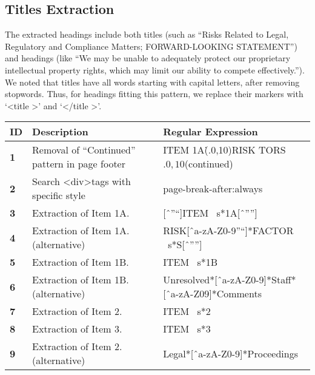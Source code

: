 \documentclass[logo,bsc,singlespacing,parskip]{infthesis}
\begin{document}
\subsection{Titles Extraction}

The extracted headings include both titles (such as “Risks Related to Legal, Regulatory and Compliance Matters; FORWARD-LOOKING STATEMENT”) and headings (like “We may be unable to adequately protect our proprietary intellectual property rights, which may limit our ability to compete effectively.”). We noted that titles have all words starting with capital letters, after removing stopwords. Thus, for headings fitting this pattern, we replace their markers with ‘\textless title \textgreater’ and ‘\textless /title \textgreater’.


\begin{table}[ht]
    \centering
    \begin{tabular}{|m{0.5cm}|m{7cm}|m{7cm}|}
        \hline
        \textbf{ID} & \textbf{Description} & \textbf{Regular Expression} \\
        \hline
        \textbf{1} & {\scriptsize Removal of “Continued” pattern in page footer} & {\scriptsize ITEM 1A\.(.{0,10})RISK TORS\(.{0,10}\)(continued)} \\
        \hline
        \textbf{2} & {\scriptsize Search \textless div\textgreater tags with specific style } & {\scriptsize page-break-after\s*:\s*always } \\
        \hline
        \textbf{3} & {\scriptsize Extraction of Item 1A. } & {\scriptsize [ˆ”“]ITEM \ s*1A[ˆ””]} \\
        \hline
        \textbf{4} & {\scriptsize Extraction of Item 1A. (alternative)} & {\scriptsize RISK[ˆa-zA-Z0-9”“]*FACTOR \ s*S[ˆ””] } \\
        \hline
        \textbf{5} & {\scriptsize Extraction of Item 1B.} & {\scriptsize ITEM \ s*1B} \\
        \hline
        \textbf{6} & {\scriptsize Extraction of Item 1B. (alternative)} & {\scriptsize Unresolved*[ˆa-zA-Z0-9]*Staff*[ˆa-zA-Z09]*Comments} \\
        \hline
        \textbf{7} & {\scriptsize Extraction of Item 2.} & {\scriptsize ITEM \ s*2} \\
        \hline
        \textbf{8} & {\scriptsize Extraction of Item 3.} & {\scriptsize ITEM \ s*3}  \\
        \hline
        \textbf{9} & {\scriptsize Extraction of Item 2. (alternative)} & {\scriptsize Legal*[ˆa-zA-Z0-9]*Proceedings} \\

\end{tabular}
\end{table}
\end{document}

